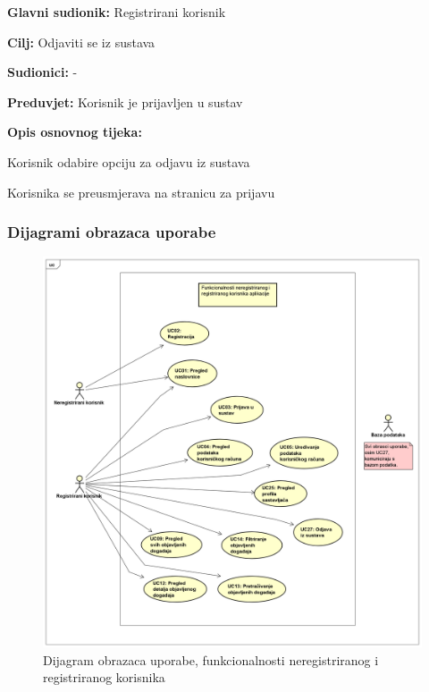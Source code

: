 				
				\noindent {}
				\begin{packed_item}
					
					\item \textbf{Glavni sudionik:} Registrirani korisnik
					\item  \textbf{Cilj:} Odjaviti se iz sustava
					\item  \textbf{Sudionici:} -
					\item  \textbf{Preduvjet:} Korisnik je prijavljen u sustav
					\item  \textbf{Opis osnovnog tijeka:}
					
					\item[] \begin{packed_enum}
						
						\item Korisnik odabire opciju za odjavu iz sustava
						\item Korisnika se preusmjerava na stranicu za prijavu
						
					\end{packed_enum}
					
				\end{packed_item}
				
			
			
				
					
				\subsubsection{Dijagrami obrazaca uporabe}
					
				\begin{figure}[H]
					\includegraphics[width=\textwidth]{dijagrami/UseCaseDiagram1.PNG} 
					\caption{Dijagram obrazaca uporabe, funkcionalnosti neregistriranog i registriranog korisnika}
					\label{fig:UseCaseDiagram1}
				\end{figure}
				
